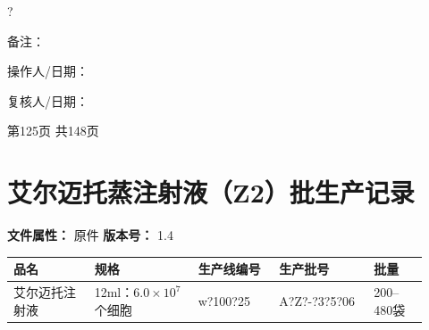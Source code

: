 \documentclass[UTF8,10pt,a4paper,fontset=fandol]{ctexart}
\newcommand{\fieldvalue}[1]{#1}
\newcommand{\handwritten}[1]{#1}
\begin{document}
\noindent\fieldvalue{\handwritten{2025?}}

\vspace{0.8em}

\noindent
备注：

\fieldvalue{\handwritten{\checkmark}}

\vspace{1em}

\noindent
操作人/日期：

\fieldvalue{\handwritten{\checkmark}}
\hfill
复核人/日期：

\fieldvalue{\handwritten{\checkmark}}

\vfill

\begin{center}
第125页 共148页
\end{center}

\newpage

\section*{艾尔迈托蒸注射液（Z2）批生产记录}

\noindent
\textbf{文件属性：}
\fieldvalue{原件}
\qquad
\textbf{版本号：}
\fieldvalue{1.4}

\vspace{2mm}

\begin{tabular}{|p{0.18\linewidth}|p{0.23\linewidth}|p{0.18\linewidth}|p{0.21\linewidth}|p{0.12\linewidth}|}
\hline
\centering 品名 & \centering 规格 & \centering 生产线编号 & \centering 生产批号 & \centering 批量 \\
\hline
\fieldvalue{艾尔迈托注射液}
&
\fieldvalue{12ml：$6.0\times10^{7}$个细胞}
&
\fieldvalue{\handwritten{w?100?25}}
&
\fieldvalue{\handwritten{A?Z?-?3?5?06}}
&
\fieldvalue{200--480袋}
\\
\hline
\end{tabular}
\end{document}
